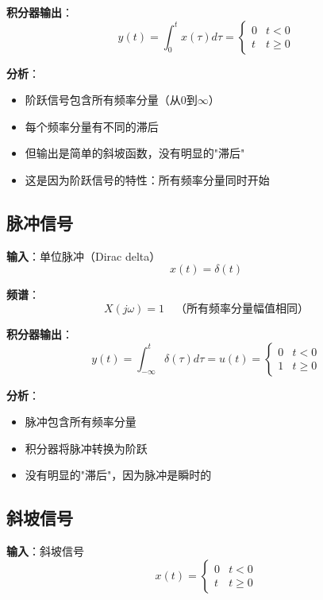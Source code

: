 \documentclass[12pt,a4paper]{article}
\begin{document}
\textbf{积分器输出}：
\begin{equation}
y(t) = \int_0^t x(\tau) d\tau = \begin{cases}
0 & t < 0 \\
t & t \geq 0
\end{cases}
\end{equation}

\textbf{分析}：
\begin{itemize}
\item 阶跃信号包含所有频率分量（从0到$\infty$）
\item 每个频率分量有不同的滞后
\item 但输出是简单的斜坡函数，没有明显的"滞后"
\item 这是因为阶跃信号的特性：所有频率分量同时开始
\end{itemize}

\subsection{脉冲信号}

\textbf{输入}：单位脉冲（Dirac delta）
\begin{equation}
x(t) = \delta(t)
\end{equation}

\textbf{频谱}：
\begin{equation}
X(j\omega) = 1 \quad \text{（所有频率分量幅值相同）}
\end{equation}

\textbf{积分器输出}：
\begin{equation}
y(t) = \int_{-\infty}^t \delta(\tau) d\tau = u(t) = \begin{cases}
0 & t < 0 \\
1 & t \geq 0
\end{cases}
\end{equation}

\textbf{分析}：
\begin{itemize}
\item 脉冲包含所有频率分量
\item 积分器将脉冲转换为阶跃
\item 没有明显的"滞后"，因为脉冲是瞬时的
\end{itemize}

\subsection{斜坡信号}

\textbf{输入}：斜坡信号
\begin{equation}
x(t) = \begin{cases}
0 & t < 0 \\
t & t \geq 0
\end{cases}
\end{equation}
\end{document}
